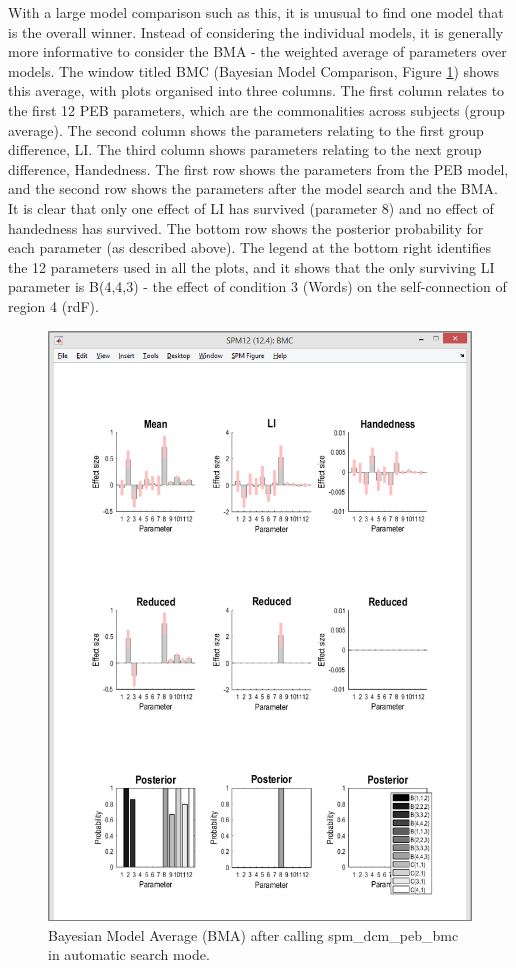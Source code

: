 \documentclass{article}
\begin{document}
With a large model comparison such as this, it is unusual to find one model that is the overall winner. Instead of considering the individual models, it is generally more informative to consider the BMA - the weighted average of parameters over models. The window titled BMC (Bayesian Model Comparison, Figure \ref{Fig_peb_search_part2}) shows this average, with plots organised into three columns. The first column relates to the first 12 PEB parameters, which are the commonalities across subjects (group average). The second column shows the parameters relating to the first group difference, LI. The third column shows parameters relating to the next group difference, Handedness. The first row shows the parameters from the PEB model, and the second row shows the parameters after the model search and the BMA. It is clear that only one effect of LI has survived (parameter 8) and no effect of handedness has survived. The bottom row shows the posterior probability for each parameter (as described above). The legend at the bottom right identifies the 12 parameters used in all the plots, and it shows that the only surviving LI parameter is B(4,4,3) - the effect of condition 3 (Words) on the self-connection of region 4 (rdF).

\begin{figure}[ht]
\begin{center}
\includegraphics{"Fig_peb_search_part2"}
\caption{Bayesian Model Average (BMA) after calling spm\_dcm\_peb\_bmc in automatic search mode.\label{Fig_peb_search_part2}}
\end{center}
\end{figure}
\end{document}
